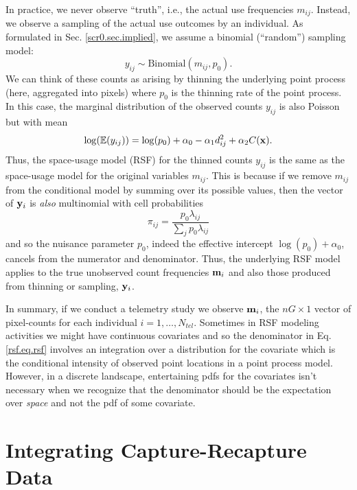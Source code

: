 In practice, we never observe ``truth'', i.e., the actual use
frequencies $m_{ij}$. Instead, we observe a sampling of the actual use
outcomes by an individual.  As formulated in
Sec. \ref{scr0.sec.implied}, we assume a binomial (``random'')
sampling model:
\[
 y_{ij} \sim \mbox{Binomial}(m_{ij}, p_{0}).
\]
We can think of these counts as arising by thinning the underlying
point process (here, aggregated into pixels) where $p_{0}$ is the
thinning rate of the point process.  In this case, the marginal
distribution of the observed counts $y_{ij}$ is also Poisson but with mean
\[
 \log(\mathbb{E}(y_{ij}))  = \log(p_{0}) + \alpha_{0} -\alpha_{1} d_{ij}^{2} +  \alpha_{2} C({\bf x}).
\]
Thus, the space-usage model (RSF) for the thinned counts $y_{ij}$ is
the same as the space-usage model for the original variables $m_{ij}$.
This is because if we remove $m_{ij}$ from the conditional model by
summing over its possible values, then the vector of ${\bf y}_{i}$ is
{\it also} multinomial with cell probabilities
\[
\pi_{ij} = \frac{p_{0}\lambda_{ij}}{\sum_{j} p_{0} \lambda_{ij}}
\]
and so the nuisance parameter $p_{0}$, indeed the effective intercept
$\log(p_{0}) + \alpha_{0}$, cancels from the numerator and
denominator. Thus, the underlying RSF model applies to the true
unobserved count frequencies ${\bf m}_{i}$ and also those produced
from thinning or sampling, ${\bf y}_{i}$.


In summary, if we conduct a telemetry study we observe ${\bf m}_{i}$,
the $nG \times 1$ vector of pixel-counts for each individual
$i=1,\ldots,N_{tel}$.  
Sometimes in RSF modeling activities we might have continuous
covariates and so the denominator in Eq. \ref{rsf.eq.rsf} involves an
integration over a distribution for the covariate which is the
conditional intensity of observed point locations in a point process
model. However, in a discrete landscape, entertaining pdfs for the
covariates isn't necessary \citep{royle_etal:2012mee} when we
recognize that the denominator should be the expectation over {\it
  space} and not the pdf of some covariate.


\section{Integrating Capture-Recapture Data}

